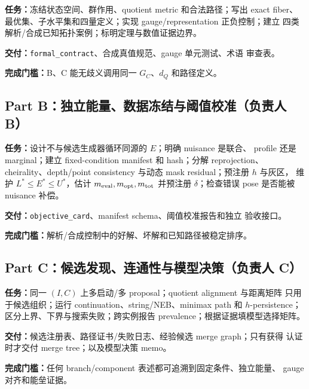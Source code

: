 \documentclass[UTF8,a4paper,11pt]{ctexart}
\begin{document}
\textbf{任务：}冻结状态空间、群作用、quotient metric 和合法路径；写出 exact
fiber、最优集、子水平集和四量定义；实现 gauge/representation 正负控制；建立
四类解析/合成已知拓扑案例；标明定理与数值证据边界。

\textbf{交付：}\texttt{formal\_contract}、合成真值规范、gauge 单元测试、术语
审查表。

\textbf{完成门槛：}B、C 能无歧义调用同一 $G_C$、$d_Q$ 和路径定义。

\subsection{Part B：独立能量、数据冻结与阈值校准（负责人 B）}

\textbf{任务：}设计不与候选生成器循环同源的 $E$；明确 nuisance 是联合、
profile 还是 marginal；建立 fixed-condition manifest 和 hash；分解 reprojection、
cheirality、depth/point consistency 与动态 mask residual；预注册 $h$ 与灰区，
维护 $L^*\le E^*\le U^*$，估计 $m_{\rm eval},m_{\rm opt},m_{\rm tot}$ 并预注册
$\delta$；检查错误 pose 是否能被 nuisance 补偿。

\textbf{交付：}\texttt{objective\_card}、manifest schema、阈值校准报告和独立
验收接口。

\textbf{完成门槛：}解析/合成控制中的好解、坏解和已知路径被稳定排序。

\subsection{Part C：候选发现、连通性与模型决策（负责人 C）}

\textbf{任务：}同一 $(I,C)$ 上多启动/多 proposal；quotient alignment 与距离矩阵
只用于候选组织；运行 continuation、string/NEB、minimax path 和 $h$-persistence；
区分上界、下界与搜索失败；跨实例报告 prevalence；根据证据填模型选择矩阵。

\textbf{交付：}候选注册表、路径证书/失败日志、经验候选 merge graph；只有获得
认证时才交付 merge tree；以及模型决策 memo。

\textbf{完成门槛：}任何 branch/component 表述都可追溯到固定条件、独立能量、
gauge 对齐和能垒证据。

\begin{center}
\end{center}
\end{document}
